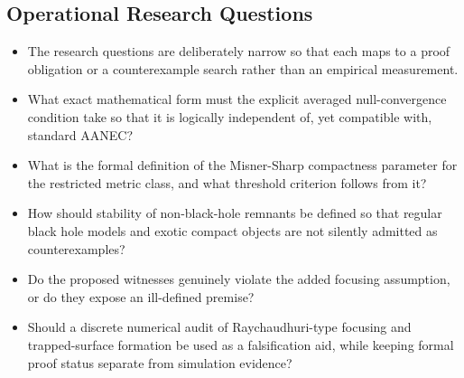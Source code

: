 \documentclass[conference]{IEEEtran}
\begin{document}
\subsection{Operational Research Questions}
\begin{itemize}
\item The research questions are deliberately narrow so that each maps to a proof obligation or a counterexample search rather than an empirical measurement.
\item What exact mathematical form must the explicit averaged null-convergence condition take so that it is logically independent of, yet compatible with, standard AANEC?
\item What is the formal definition of the Misner-Sharp compactness parameter for the restricted metric class, and what threshold criterion follows from it?
\item How should stability of non-black-hole remnants be defined so that regular black hole models and exotic compact objects are not silently admitted as counterexamples?
\item Do the proposed witnesses genuinely violate the added focusing assumption, or do they expose an ill-defined premise?
\item Should a discrete numerical audit of Raychaudhuri-type focusing and trapped-surface formation be used as a falsification aid, while keeping formal proof status separate from simulation evidence?
\end{itemize}
\end{document}
